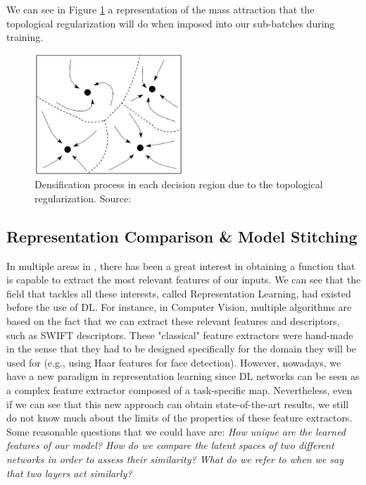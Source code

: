 \documentclass[../main.tex]{subfiles}
\begin{document}
We can see in Figure \ref{fig:attrac} a representation of the mass attraction that the topological regularization will do when imposed into our sub-batches during training.

\begin{figure}[!ht]
    \centering
    \includegraphics[width=0.5\textwidth]{figures/bg/atractor.png} 
    \caption{Densification process in each decision region due to the topological regularization. Source: \cite{torres_hopfield_2019}}
    \label{fig:attrac}
\end{figure}

\subsection{Representation Comparison \& Model Stitching}
\label{sec:repLearn}

In multiple areas in , there has been a great interest in obtaining a function that is capable to extract the most relevant features of our inputs. We can see that the field that tackles all these interests, called Representation Learning, had existed before the use of DL. For instance, in Computer Vision, multiple algorithms are based on the fact that we can extract these relevant features and descriptors, such as SWIFT descriptors. These "classical" feature extractors were hand-made in the sense that they had to be designed specifically for the domain they will be used for (e.g., using Haar features for face detection). However, nowadays, we have a new paradigm in representation learning since DL networks can be seen as a complex feature extractor composed of a task-specific map. Nevertheless, even if we can see that this new approach can obtain state-of-the-art results, we still do not know much about the limits of the properties of these feature extractors. Some reasonable questions that we could have are: \textit{How unique are the learned features of our model? How do we compare the latent spaces of two different networks in order to assess their similarity? What do we refer to when we say that two layers act similarly?} 
\end{document}
